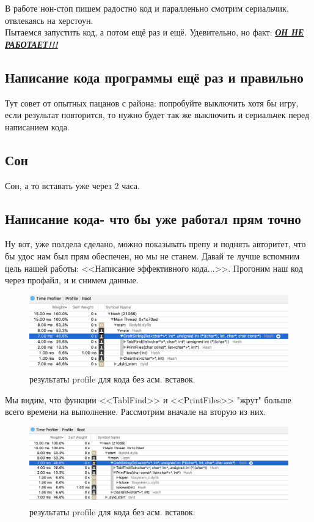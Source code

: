 \documentclass[a4paper,12pt]{article} %
\begin{document}
В работе нон-стоп пишем радостно код и паралленьно смотрим сериальчик, отвлекаясь на херстоун.\\
Пытаемся запустить код, а потом ещё раз и ещё. Удевительно, но факт: \textbf{\underline{\textit{ОН НЕ РАБОТАЕТ!!!}}}
\subsection{Написание кода программы ещё раз и правильно}

Тут совет от опытных пацанов с района: попробуйте выключить хотя бы игру, если результат повторится, то нужно будет так же выключить и сериальчек перед написанием кода.
\subsection{Сон}

Сон, а то вставать уже через 2 часа.
\subsection{Написание кода- что бы уже работал прям точно}

Ну вот, уже полдела сделано, можно показывать препу и поднять авторитет, что бы удос нам был прям обеспечен, но мы не станем. Давай те лучше вспомним цель нашей работы: <<Написание эффективного кода...>>. Прогоним наш код через профайл, и и снимем данные.

\begin{figure}[h!]
\begin{center}
\includegraphics[width=1\textwidth]{1}
\end{center}
\caption{результаты profile для кода без асм. вставок.}
\end{figure}

Мы видим, что функции <<TablFind>> и <<PrintFiles>> "жрут" больше всего времени на выполнение. Рассмотрим вначале на вторую из них.

\begin{figure}[h!]
\begin{center}
\includegraphics[width=1\textwidth]{2}
\end{center}
\caption{результаты profile для кода без асм. вставок.}
\end{figure}
\end{document}
